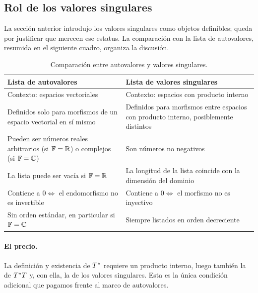 \subsection{Rol de los valores singulares}
La sección anterior introdujo los valores singulares como objetos definibles; queda por justificar que merecen ese estatus. La comparación con la lista de autovalores, resumida en el siguiente cuadro, organiza la discusión.

\begin{table}[h]
	\centering
	\renewcommand{\arraystretch}{1.35}
	\begin{tabularx}{\textwidth}{@{}>{\raggedright\arraybackslash}X
		>{\raggedright\arraybackslash}X@{}}
		\toprule
		\textbf{Lista de autovalores}
		 & \textbf{Lista de valores singulares}                          \\
		\midrule
		Contexto: espacios vectoriales
		 & Contexto: espacios con producto interno                       \\
		\addlinespace
		Definidos solo para morfismos de un espacio vectorial en sí mismo
		 & Definidos para morfismos entre espacios con producto interno,
		posiblemente distintos                                           \\
		\addlinespace
		Pueden ser números reales arbitrarios (si $\mathbb{F}=\mathbb{R}$) o complejos
		(si $\mathbb{F}=\mathbb{C}$)
		 & Son números no negativos                                      \\
		\addlinespace
		La lista puede ser vacía si $\mathbb{F}=\mathbb{R}$
		 & La longitud de la lista coincide con la dimensión del dominio \\
		\addlinespace
		Contiene a $0 \iff$ el endomorfismo no es invertible
		 & Contiene a $0 \iff$ el morfismo no es inyectivo               \\
		\addlinespace
		Sin orden estándar, en particular si $\mathbb{F}=\mathbb{C}$
		 & Siempre listados en orden decreciente                         \\
		\bottomrule
	\end{tabularx}
	\caption{Comparación entre autovalores y valores singulares.}
	\label{tab:autovalores_vs_singulares}
\end{table}

\paragraph{El precio.} La definición y existencia de $T^{\ast}$ requiere un producto interno, luego también la de $T^{\ast} T$ y, con ella, la de los valores singulares. Esta es la única condición adicional que pagamos frente al marco de
autovalores.
